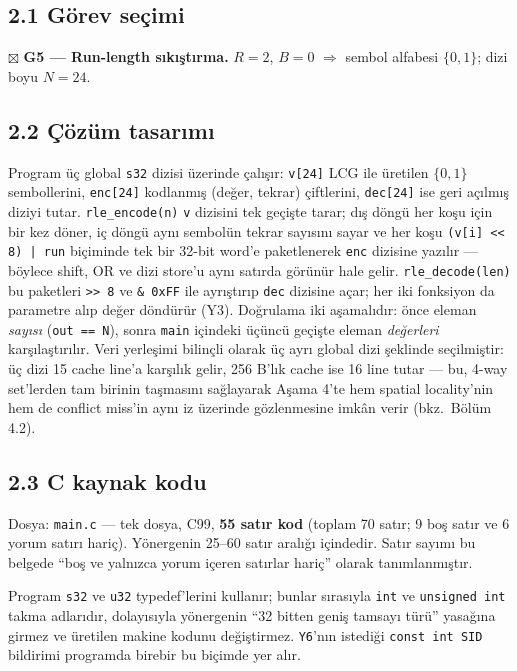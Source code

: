 \documentclass[11pt,a4paper]{article}
\newcommand{\tl}{\texttt}
\begin{document}
\subsection*{2.1 Görev seçimi}

$\boxtimes$ \textbf{G5 --- Run-length sıkıştırma.} $R = 2$, $B = 0$ $\Rightarrow$ sembol alfabesi
$\{0, 1\}$; dizi boyu $N = 24$.

\subsection*{2.2 Çözüm tasarımı}

Program üç global \tl{s32} dizisi üzerinde çalışır: \tl{v[24]} LCG ile üretilen $\{0,1\}$
sembollerini, \tl{enc[24]} kodlanmış (değer, tekrar) çiftlerini, \tl{dec[24]} ise geri açılmış
diziyi tutar. \tl{rle\_encode(n)} \tl{v} dizisini tek geçişte tarar; dış döngü her koşu için bir
kez döner, iç döngü aynı sembolün tekrar sayısını sayar ve her koşu \tl{(v[i] << 8) | run}
biçiminde tek bir 32-bit word'e paketlenerek \tl{enc} dizisine yazılır --- böylece shift, OR ve
dizi store'u aynı satırda görünür hale gelir. \tl{rle\_decode(len)} bu paketleri \tl{>> 8} ve
\tl{\& 0xFF} ile ayrıştırıp \tl{dec} dizisine açar; her iki fonksiyon da parametre alıp değer
döndürür (Y3). Doğrulama iki aşamalıdır: önce eleman \textit{sayısı} (\tl{out == N}), sonra
\tl{main} içindeki üçüncü geçişte eleman \textit{değerleri} karşılaştırılır. Veri yerleşimi
bilinçli olarak üç ayrı global dizi şeklinde seçilmiştir: üç dizi 15 cache line'a karşılık gelir,
256 B'lık cache ise 16 line tutar --- bu, 4-way set'lerden tam birinin taşmasını sağlayarak
Aşama 4'te hem spatial locality'nin hem de conflict miss'in aynı iz üzerinde gözlenmesine imkân
verir (bkz.\ Bölüm 4.2).

\subsection*{2.3 C kaynak kodu}

Dosya: \tl{main.c} --- tek dosya, C99, \textbf{55 satır kod} (toplam 70 satır; 9 boş satır ve
6 yorum satırı hariç). Yönergenin 25--60 satır aralığı içindedir. Satır sayımı bu belgede
``boş ve yalnızca yorum içeren satırlar hariç'' olarak tanımlanmıştır.

Program \tl{s32} ve \tl{u32} typedef'lerini kullanır; bunlar sırasıyla \tl{int} ve
\tl{unsigned int} takma adlarıdır, dolayısıyla yönergenin ``32 bitten geniş tamsayı türü''
yasağına girmez ve üretilen makine kodunu değiştirmez. \tl{Y6}'nın istediği
\tl{const int SID} bildirimi programda birebir bu biçimde yer alır.
\end{document}

